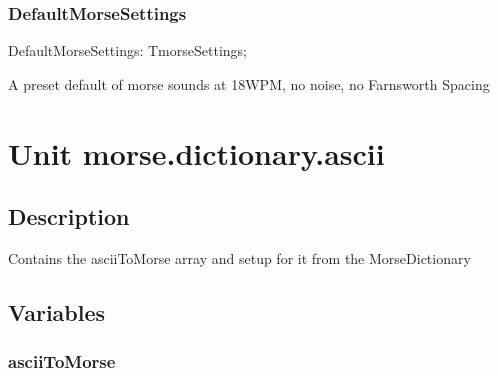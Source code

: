 \documentclass{report}
\newif\ifpdf
\begin{document}
\subsection*{DefaultMorseSettings}
\fi
\label{morse.base-DefaultMorseSettings}
\begin{list}{}{
\setlength{\itemindent}{0cm}
\setlength{\listparindent}{0cm}
\setlength{\leftmargin}{\evensidemargin}
\addtolength{\leftmargin}{\tmplength}
\settowidth{\labelsep}{X}
\addtolength{\leftmargin}{\labelsep}
\setlength{\labelwidth}{\tmplength}
}
\item[\textbf{Declaration}\hfill]
\ifpdf
\begin{flushleft}
\fi
\begin{ttfamily}
DefaultMorseSettings: TmorseSettings;\end{ttfamily}

\ifpdf
\end{flushleft}
\fi

\par
\item[\textbf{Description}]
A preset default of morse sounds at 18WPM, no noise, no Farnsworth Spacing

\end{list}
\chapter{Unit morse.dictionary.ascii}
\label{morse.dictionary.ascii}
\section{Description}
Contains the asciiToMorse array and setup for it from the MorseDictionary
\section{Variables}
\ifpdf
\subsection*{\large{\textbf{asciiToMorse}}\normalsize\hspace{1ex}\hrulefill}
\else
\end{document}
